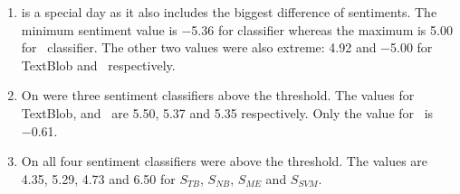 
\begin{enumerate}
    \item 
         is a special day as it also includes the biggest difference of sentiments.
        The minimum sentiment value is \num{-5.36} for \nb classifier whereas the maximum is \num{5.00} for \me\ classifier.
        The other two values were also extreme: \num{4.92} and \num{-5.00} for TextBlob and \svm\ respectively.

    \item
        On  were three sentiment classifiers above the threshold.
        The values for TextBlob, \nb and \me\ are \num{5.50}, \num{5.37} and \num{5.35} respectively.
        Only the value for \svm\ is \num{-0.61}.

    \item
        On  all four sentiment classifiers were above the threshold.
        The values are \num{4.35}, \num{5.29}, \num{4.73} and \num{6.50} for $S_{TB}$, $S_{NB}$, $S_{ME}$ and $S_{SVM}$.
\end{enumerate}

\begin{figure}[hbt]
    \centering
    
    \caption{\sentimentsCaption{\hyundai}}
    \label{fig:analysis-sentiments-hyundai}
\end{figure} 

